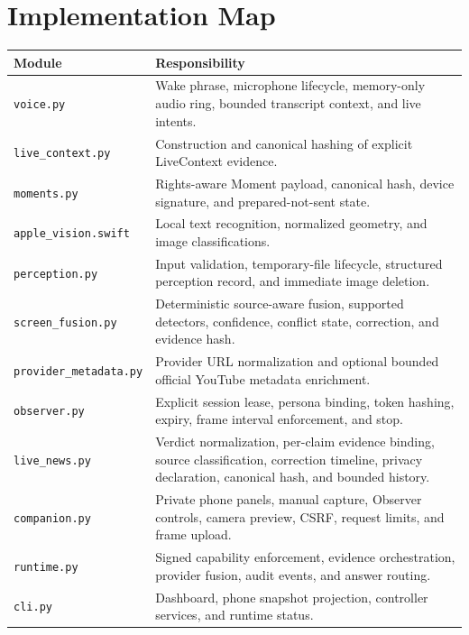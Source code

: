\documentclass[11pt,a4paper]{article}
\begin{document}
\section{Implementation Map}

\begin{table}[htbp]
\centering
\small
\begin{tabularx}{\textwidth}{@{}L{43mm}Y@{}}
\toprule
Module & Responsibility\\
\midrule
\texttt{voice.py} & Wake phrase, microphone lifecycle, memory-only audio ring,
bounded transcript context, and live intents.\\
\texttt{live\_context.py} & Construction and canonical hashing of explicit
LiveContext evidence.\\
\texttt{moments.py} & Rights-aware Moment payload, canonical hash, device
signature, and prepared-not-sent state.\\
\texttt{apple\_vision.swift} & Local text recognition, normalized geometry, and
image classifications.\\
\texttt{perception.py} & Input validation, temporary-file lifecycle, structured
perception record, and immediate image deletion.\\
\texttt{screen\_fusion.py} & Deterministic source-aware fusion, supported
detectors, confidence, conflict state, correction, and evidence hash.\\
\texttt{provider\_metadata.py} & Provider URL normalization and optional
bounded official YouTube metadata enrichment.\\
\texttt{observer.py} & Explicit session lease, persona binding, token hashing,
expiry, frame interval enforcement, and stop.\\
\texttt{live\_news.py} & Verdict normalization, per-claim evidence binding,
source classification, correction timeline, privacy declaration, canonical
hash, and bounded history.\\
\texttt{companion.py} & Private phone panels, manual capture, Observer controls,
camera preview, CSRF, request limits, and frame upload.\\
\texttt{runtime.py} & Signed capability enforcement, evidence orchestration,
provider fusion, audit events, and answer routing.\\
\texttt{cli.py} & Dashboard, phone snapshot projection, controller services,
and runtime status.\\
\bottomrule
\end{tabularx}
\end{table}
\end{document}
